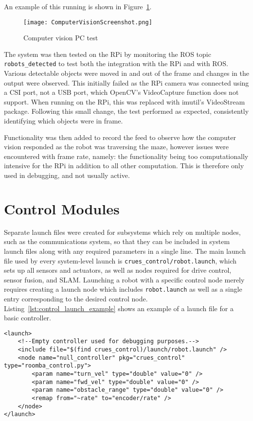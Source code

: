 \noindent
An example of this running is shown in Figure~\ref{fig:cv_screenshot}.

\begin{figure}[!ht]
	\centering
	\texttt{[image: ComputerVisionScreenshot.png]}
	\caption{Computer vision PC test}\label{fig:cv_screenshot}
\end{figure}

The system was then tested on the RPi by monitoring the ROS topic \verb|robots_detected| to
test both the integration with the RPi and with ROS. Various detectable objects were moved in
and out of the frame and changes in the output were observed. This initially failed as the RPi
camera was connected using a CSI port, not a USB port, which OpenCV's VideoCapture function
does not support. When running on the RPi, this was replaced with imutil's VideoStream package.
Following this small change, the test performed as expected, consistently identifying which
objects were in frame.

Functionality was then added to record the feed to observe how the computer vision responded as
the robot was traversing the maze, however issues were encountered with frame rate, namely:
the functionality being too computationally intensive for the RPi in addition to all other
computation. This is therefore only used in debugging, and not usually active.

\section{Control Modules}\label{soft/control}


Separate launch files were created for subsystems which rely on multiple nodes,
such as the communications system, so that they can be included in system launch
files along with any required parameters in a single line. The main launch file
used by every system-level launch is \verb|crues_control/robot.launch|, which
sets up all sensors and actuators, as well as nodes required for drive control,
sensor fusion, and SLAM. Launching a robot with a specific control node
merely requires creating a launch node which includes \verb|robot.launch| as
well as a single entry corresponding to the desired control node.
Listing~\ref{lst:control_launch_example} shows an example of a launch file for
a basic controller.

\begin{lstlisting}[caption={Launch file for null controller}, label={lst:control_launch_example}, style=xml]
<launch>
    <!--Empty controller used for debugging purposes.-->
    <include file="$(find crues_control)/launch/robot.launch" />
    <node name="null_controller" pkg="crues_control" type="roomba_control.py">
        <param name="turn_vel" type="double" value="0" />
        <param name="fwd_vel" type="double" value="0" />
        <param name="obstacle_range" type="double" value="0" />
        <remap from="~rate" to="encoder/rate" />
    </node>
</launch>
\end{lstlisting}


